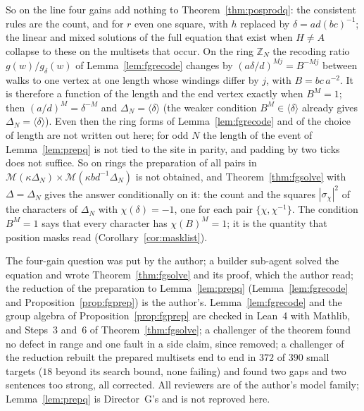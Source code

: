 So on the line four gains add nothing to Theorem~\ref{thm:posprodq}: the consistent rules are the count, and for $r$ even one square, with $h$ replaced by $\delta=ad(bc)^{-1}$; the linear and mixed solutions of the full equation that exist when $H\ne A$ collapse to these on the multisets that occur. On the ring $\mathbb{Z}_N$ the recoding ratio $g(w)/g_\delta(w)$ of Lemma~\ref{lem:fgrecode} changes by $(a\delta/d)^{Mj}=B^{-Mj}$ between walks to one vertex at one length whose windings differ by $j$, with $B=bc\,a^{-2}$. It is therefore a function of the length and the end vertex exactly when $B^{M}=1$; then $(a/d)^M=\delta^{-M}$ and $\Delta_N=\langle\delta\rangle$ (the weaker condition $B^M\in\langle\delta\rangle$ already gives $\Delta_N=\langle\delta\rangle$). Even then the ring forms of Lemma~\ref{lem:fgrecode} and of the choice of length are not written out here; for odd $N$ the length of the event of Lemma~\ref{lem:prepq} is not tied to the site in parity, and padding by two ticks does not suffice. So on rings the preparation of all pairs in $\mathcal{M}(\kappa\Delta_N)\times\mathcal{M}(\kappa bd^{-1}\Delta_N)$ is not obtained, and Theorem~\ref{thm:fgsolve} with $\Delta=\Delta_N$ gives the answer conditionally on it: the count and the squares $|\sigma_\chi|^2$ of the characters of $\Delta_N$ with $\chi(\delta)=-1$, one for each pair $\{\chi,\chi^{-1}\}$. The condition $B^M=1$ says that every character has $\chi(B)^M=1$; it is the quantity that position masks read (Corollary~\ref{cor:masklist}).

The four-gain question was put by the author; a builder sub-agent solved the equation and wrote Theorem~\ref{thm:fgsolve} and its proof, which the author read; the reduction of the preparation to Lemma~\ref{lem:prepq} (Lemma~\ref{lem:fgrecode} and Proposition~\ref{prop:fgprep}) is the author's. Lemma~\ref{lem:fgrecode} and the group algebra of Proposition~\ref{prop:fgprep} are checked in Lean~4 with Mathlib, and Steps~3 and~6 of Theorem~\ref{thm:fgsolve}; a challenger of the theorem found no defect in range and one fault in a side claim, since removed; a challenger of the reduction rebuilt the prepared multisets end to end in $372$ of $390$ small targets ($18$ beyond its search bound, none failing) and found two gaps and two sentences too strong, all corrected. All reviewers are of the author's model family; Lemma~\ref{lem:prepq} is Director~G's and is not reproved here.
